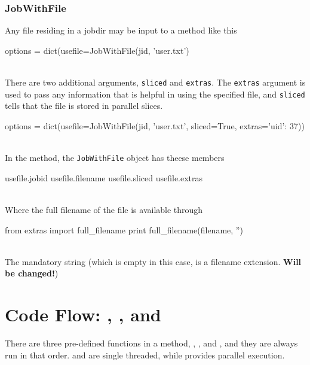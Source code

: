 \subsubsection*{JobWithFile}
Any file residing in a jobdir may be input to a method like this
\\
\begin{pythonBEG}
  options = dict(usefile=JobWithFile(jid, 'user.txt')
\end{pythonBEG}
\\
There are two additional arguments, \texttt{sliced} and
\texttt{extras}.  The \texttt{extras} argument is used to pass any
information that is helpful in using the specified file, and
\texttt{sliced} tells that the file is stored in parallel slices.
\\
\begin{pythonMID}
options = dict(usefile=JobWithFile(jid, 'user.txt', sliced=True, extras={'uid': 37}))
\end{pythonMID}
\\
In the method, the \texttt{JobWithFile} object has theese members
\\
\begin{pythonEND}
  usefile.jobid
  usefile.filename
  usefile.sliced
  usefile.extras
\end{pythonEND}
\\
Where the full filename of the file is available through
\\
\begin{python}
from extras import full_filename
print full_filename(filename, '')
\end{python}
\\
The mandatory string (which is empty in this case, is a filename
extension.  \textbf{Will be changed!})





\newpage
\section{Code Flow:  \prepare, \analysis, and \synthesis}

There are three pre-defined functions in a method, \prepare,
\analysis, and \synthesis, and they are always run in that order.
\prepare and \synthesis are single threaded, while \analysis provides
parallel execution.

